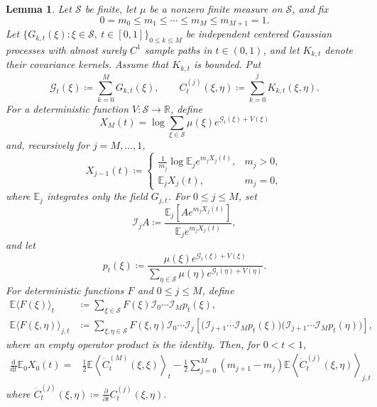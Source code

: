 \documentclass[11pt]{article}
\newtheorem{lemma}[theorem]{Lemma}
\numberwithin{equation}{section}
\newcommand{\E}{\mathbb{E}}
\newcommand{\1}{\mathbf 1}
\begin{document}
\begin{lemma}
\label{lem:finite-step-interpolation-derivative}
Let $\mathcal S$ be finite, let $\mu$ be a nonzero finite measure on
$\mathcal S$, and fix
\[
0=m_0\leq m_1\leq\cdots\leq m_M\leq m_{M+1}=1.
\]
Let $\{G_{k,t}(\xi):\xi\in\mathcal S,\ t\in[0,1]\}_{0\le k\le M}$ be independent centered Gaussian processes with almost surely $C^1$ sample paths in $t \in (0,1)$, and let $K_{k,t}$ denote their covariance kernels. Assume that $K_{k,t}$ is bounded.  Put
\[
\mathcal G_t(\xi) \coloneqq \sum_{k=0}^M G_{k,t}(\xi),
\qquad
C_t^{(j)}(\xi,\eta) \coloneqq \sum_{k=0}^jK_{k,t}(\xi,\eta).
\]
For a deterministic function $V:\mathcal S\to\mathbb R$, define
\[
X_M(t)=\log\sum_{\xi\in \mathcal S}
\mu(\xi )e^{\mathcal G_t(\xi)+V(\xi)}
\]
and, recursively for $j=M,\ldots,1$,
\begin{equation}\label{eq:defXB1}
X_{j-1}(t) \coloneqq
\begin{cases}
\displaystyle
\frac1{m_j}\log\E_j e^{m_jX_j(t)},&m_j>0,\\[3mm]
\E_jX_j(t),&m_j=0,
\end{cases}
\end{equation}
where $\E_j$ integrates only the field $G_{j,t}$.  For
$0\leq j\leq M$, set
\[
\mathcal I_jA \coloneqq \frac{\E_j[Ae^{m_jX_j(t)}]}{\E_je^{m_jX_j(t)}},
\]
and let
\[
p_t(\xi) \coloneqq
\frac{\mu(\xi)e^{\mathcal G_t(\xi)+V(\xi)}}
{\sum_{\eta\in\mathcal S}
\mu(\eta)e^{\mathcal G_t(\eta)+V(\eta)}}.
\]
For deterministic functions $F$ and $0\leq j\leq M$, define
\begin{align*}
\E\langle F(\xi) \rangle_t
&\coloneqq \sum_{\xi\in\mathcal S}F(\xi)
\mathcal I_0\cdots\mathcal I_Mp_t(\xi),\\
\E\langle F(\xi,\eta)\rangle_{j,t}
&\coloneqq \sum_{\xi,\eta\in\mathcal S}F(\xi,\eta)
\mathcal I_0\cdots\mathcal I_j\left[
\bigl(\mathcal I_{j+1}\cdots\mathcal I_Mp_t(\xi)\bigr)
\bigl(\mathcal I_{j+1}\cdots\mathcal I_Mp_t(\eta)\bigr)
\right],
\end{align*}
where an empty operator product is the identity.  Then, for $0<t<1$,
\begin{equation}
\begin{aligned}
\frac{\mathrm d}{\mathrm dt} \E_0X_0(t)
={}&\frac1{2}\E\left\langle
\dot C_t^{(M)}(\xi,\xi)
\right\rangle_t-\frac1{2}\sum_{j=0}^M(m_{j+1}-m_j)
\E\left\langle
\dot C_t^{(j)}(\xi,\eta)
\right\rangle_{j,t}
\end{aligned}
\label{eq:finite-step-interpolation-derivative}
\end{equation}
where $\dot C_t^{(j)}(\xi,\eta) \coloneqq \frac{\partial}{\partial t} C_t^{(j)}(\xi,\eta)$.
\end{lemma}
\end{document}
